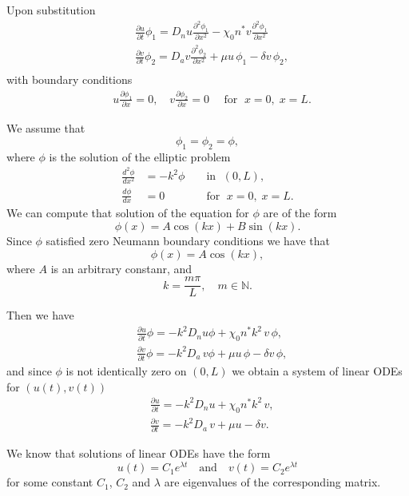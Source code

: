 \documentclass[
  letterpaper,
  DIV=11,
  numbers=noendperiod]{scrreprt}
\theoremstyle{definition}
\theoremstyle{plain}
\theoremstyle{plain}
\theoremstyle{remark}
\begin{document}
Upon substitution \[
\begin{aligned}
&\frac{\partial u}{\partial  t}  \phi_1  =   D_n  u\frac{\partial ^2 \phi_1}{\partial x^2} - \chi_0 n^*  v\frac{\partial ^2 \phi_1}{\partial x^2} \\
& \frac{\partial v}{\partial  t}  \phi_2=     D_a v \frac{\partial ^2  \phi_2}{\partial x^2}  +  \mu u \,  \phi_1 - \delta v\,  \phi_2, \\
\end{aligned}
\] with boundary conditions \[
\begin{aligned}
& u \frac{\partial \phi_1}{\partial x} = 0, \quad   v \frac{\partial \phi_2}{\partial x} = 0 \quad \text{ for } \; x = 0, \; x=L.
\end{aligned}
\]

We assume that\\
\[
\phi_1 = \phi_2 = \phi,
\] where \(\phi\) is the solution of the elliptic problem \[
\begin{aligned}
\frac{d^2 \phi}{dx^2} &= - k^2 \phi && \text{ in } \; (0,L), \\
\frac{d \phi}{dx} &= 0  && \text{ for } \; x=0, \; x=L. 
\end{aligned}
\] We can compute that solution of the equation for \(\phi\) are of the
form \[
\phi(x) = A \cos(kx) + B\sin(kx).
\] Since \(\phi\) satisfied zero Neumann boundary conditions we have
that \[
\phi(x) = A \cos(kx),
\] where \(A\) is an arbitrary constanr, and \[
k = \dfrac {m \pi} L, \quad m \in \mathbb N.
\]

Then we have \[
\begin{aligned}
&\frac{\partial u}{\partial  t}  \phi  =   - k^2 D_n  u \phi +  \chi_0 n^* k^2\,  v \, \phi,  \\
& \frac{\partial v}{\partial  t} \phi =   - k^2 D_a  \, v \phi  +  \mu u \,  \phi - \delta v\,  \phi, 
\end{aligned}
\] and since \(\phi\) is not identically zero on \((0,L)\) we obtain a
system of linear ODEs for \((u(t),v(t))\) \[
\begin{aligned}
&\frac{\partial u}{\partial  t}    =   - k^2 D_n  u  +  \chi_0 n^* k^2\,  v,  \\
& \frac{\partial v}{\partial  t} =   - k^2 D_a  \, v  +  \mu u  - \delta v. 
\end{aligned}
\]

We know that solutions of linear ODEs have the form \[
u(t) = C_1 e^{\lambda t} \quad \textrm{and} \quad v(t) = C_2 e^{\lambda t}
\] for some constant \(C_1\), \(C_2\) and \(\lambda\) are eigenvalues of
the corresponding matrix.
\end{document}
